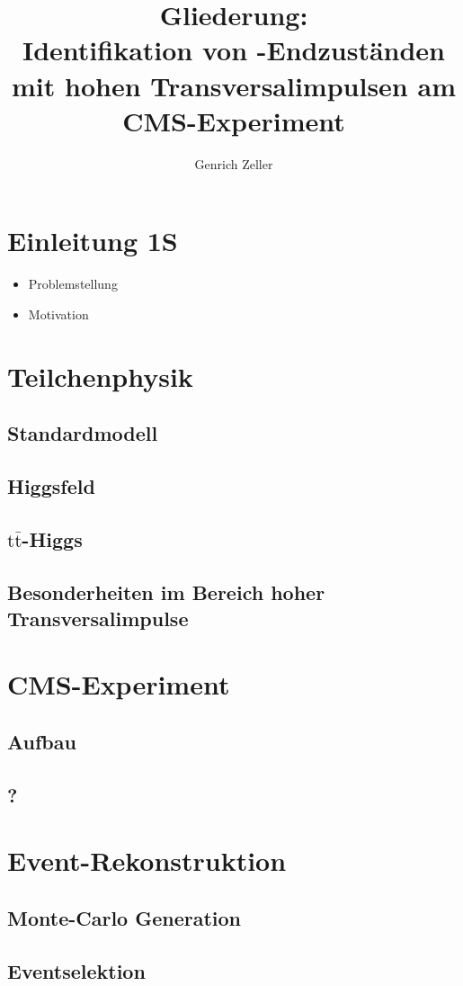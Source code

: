 \documentclass[12pt,a4paper]{article}
\title{Gliederung:\\\textbf{Identifikation von \tth -Endzuständen mit hohen Transversalimpulsen am CMS-Experiment}}
\author{Genrich Zeller}
\newcommand{\ttbar}{$\text{t} \bar{ \text{t}}$}
\begin{document}
\maketitle
\section{Einleitung \hspace*{11cm} 1S}
\begin{itemize}
\item Problemstellung
\item Motivation
\end{itemize}
\section{Teilchenphysik}
\subsection{Standardmodell}
\subsection{Higgsfeld}
\subsection{\ttbar -Higgs}
\subsection{Besonderheiten im Bereich hoher Transversalimpulse}
\section{CMS-Experiment}
\subsection{Aufbau}
\subsection{?}
\section{Event-Rekonstruktion}
\subsection{Monte-Carlo Generation}
\subsection{Eventselektion}
\end{document}

